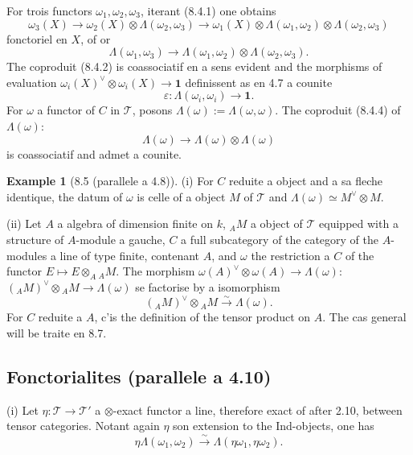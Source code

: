 \documentclass[12pt,a4paper]{article}
\theoremstyle{plain}
\theoremstyle{definition}
\newtheorem{example}[theorem]{Example}
\begin{document}
For trois functors $\omega_1, \omega_2, \omega_3$, iterant (8.4.1) one obtains
\[
\omega_3(X) \to \omega_2(X) \otimes \Lambda(\omega_2, \omega_3) \to \omega_1(X) \otimes \Lambda(\omega_1, \omega_2) \otimes \Lambda(\omega_2, \omega_3)
\]
fonctoriel en $X$, of or
\begin{equation}\label{eq:8.4.2}
\Lambda(\omega_1, \omega_3) \to \Lambda(\omega_1, \omega_2) \otimes \Lambda(\omega_2, \omega_3).
\end{equation}
The coproduit (8.4.2) is coassociatif en a sens evident and the morphisms of evaluation $\omega_i(X)^\vee \otimes \omega_i(X) \to \mathbf{1}$ definissent as en 4.7 a counite
\[
\varepsilon : \Lambda(\omega_i, \omega_i) \to \mathbf{1}.
\]
For $\omega$ a functor of $C$ in $\mathcal{T}$, posons $\Lambda(\omega) := \Lambda(\omega, \omega)$. The coproduit (8.4.4) of $\Lambda(\omega)$:
\begin{equation}\label{eq:8.4.3}
\Lambda(\omega) \to \Lambda(\omega) \otimes \Lambda(\omega)
\end{equation}
is coassociatif and admet a counite.

\begin{example}[8.5 (parallele a 4.8)]
\textup{(i)} For $C$ reduite a object and a sa fleche identique, the datum of $\omega$ is celle of a object $M$ of $\mathcal{T}$ and $\Lambda(\omega) \simeq M^\vee \otimes M$.

\textup{(ii)} Let $A$ a algebra of dimension finite on $k$, $_A M$ a object of $\mathcal{T}$ equipped with a structure of $A$-module a gauche, $C$ a full subcategory of the category of the $A$-modules a line of type finite, contenant $A$, and $\omega$ the restriction a $C$ of the functor $E \mapsto E \otimes_A {_A M}$. The morphism $\omega(A)^\vee \otimes \omega(A) \to \Lambda(\omega)$: $(_A M)^\vee \otimes {_A M} \to \Lambda(\omega)$ se factorise by a isomorphism
\[
(_A M)^\vee \otimes {_A M} \xrightarrow{\sim} \Lambda(\omega).
\]
For $C$ reduite a $A$, c'is the definition of the tensor product on $A$. The cas general will be traite en 8.7.
\end{example}

\subsection{Fonctorialites (parallele a 4.10)}

\textup{(i)} Let $\eta : \mathcal{T} \to \mathcal{T}'$ a $\otimes$-exact functor a line, therefore exact of after 2.10, between tensor categories. Notant again $\eta$ son extension to the Ind-objects, one has
\begin{equation}\label{eq:8.6.1}
\eta \Lambda(\omega_1, \omega_2) \xrightarrow{\sim} \Lambda(\eta\omega_1, \eta\omega_2).
\end{equation}
\end{document}
